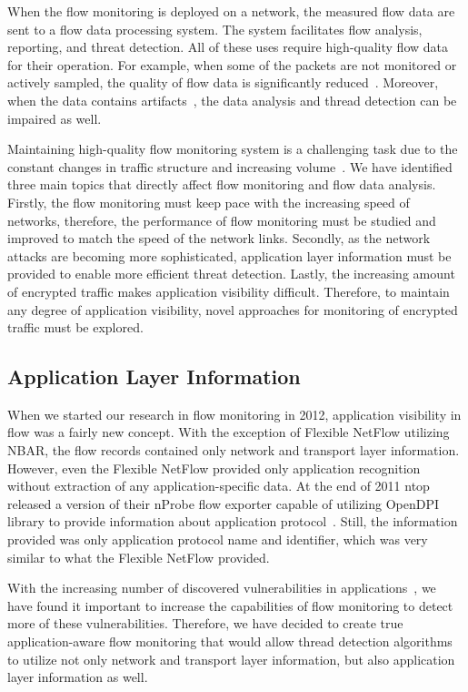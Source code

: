 When the flow monitoring is deployed on a network, the measured flow data are sent to a flow data processing system. The system facilitates flow analysis, reporting, and threat detection. All of these uses require high-quality flow data for their operation. For example, when some of the packets are not monitored or actively sampled, the quality of flow data is significantly reduced~\cite{Brauckhoff-2006-Impact}. Moreover, when the data contains artifacts~\cite{Hofstede-2013-Measurement}, the data analysis and thread detection can be impaired as well.

Maintaining high-quality flow monitoring system is a challenging task due to the constant changes in traffic structure and increasing volume~\cite{CiscoSystems-2017-Cisco}. We have identified three main topics that directly affect flow monitoring and flow data analysis. Firstly, the flow monitoring must keep pace with the increasing speed of networks, therefore, the performance of flow monitoring must be studied and improved to match the speed of the network links. Secondly, as the network attacks are becoming more sophisticated, application layer information must be provided to enable more efficient threat detection. Lastly, the increasing amount of encrypted traffic makes application visibility difficult. Therefore, to maintain any degree of application visibility, novel approaches for monitoring of encrypted traffic must be explored. 

\subsection{Application Layer Information}

When we started our research in flow monitoring in 2012, application visibility in flow was a fairly new concept. With the exception of Flexible NetFlow utilizing NBAR, the flow records contained only network and transport layer information. However, even the Flexible NetFlow provided only application recognition without extraction of any application-specific data. At the end of 2011 ntop released a version of their nProbe flow exporter capable of utilizing OpenDPI library to provide information about application protocol~\cite{ntop-2011-Unveiling}. Still, the information provided was only application protocol name and identifier, which was very similar to what the Flexible NetFlow provided.

With the increasing number of discovered vulnerabilities in applications~\cite{Younan-2013-25}, we have found it important to increase the capabilities of flow monitoring to detect more of these vulnerabilities. Therefore, we have decided to create true application-aware flow monitoring that would allow thread detection algorithms to utilize not only network and transport layer information, but also application layer information as well.

